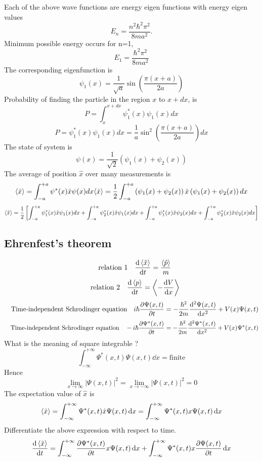 \documentclass[12pt]{article}
\begin{document}
Each of the above wave functions are energy eigen functions with energy eigen values $$E_{n}=\frac{n^2\hbar^2\pi^2}{8ma^2}.$$
Minimum possible energy occurs for n=1,   $$E_{1}=\frac{\hbar^2\pi^2}{8ma^2} $$
The corresponding eigenfunction is $$\psi_{1}(x)=\frac{1}{\sqrt{a}}\sin{\left(\frac{\pi(x+a)}{2a}\right)}$$
Probability of finding the particle in the region \( x\) to \(x+dx\), is \[P=\int_{x}^{x+dx}\psi_{1}^{*}(x)\psi_{1}(x)dx\]
\[P=\psi_{1}^{*}(x)\psi_{1}(x)dx=\frac{1}{a}\sin^{2}{\left(\frac{\pi(x+a)}{2a}\right)}dx\]
The state of system is \[\psi(x)=\frac{1}{\sqrt{2}}\left(\psi_{1}(x)+\psi_{2}(x) \right )\]
The average of position \(\hat{x}\) over many measurements is 
\[\expval{\hat{x}}=\int_{-a}^{+a}\psi^{*}(x)\hat{x}\psi(x)dx
\langle\hat{x}\rangle=\frac{1}{2}\int_{-a}^{+a}\left(\psi_{1}(x)+\psi_{2}(x) \right )\hat{x}\left(\psi_{1}(x)+\psi_{2}(x) \right )dx\]
\[\expval{\hat{x}}=\frac{1}{2}\left[\int_{-a}^{+a}\psi_{1}^{*}(x)\hat{x}\psi_{1}(x)dx+\int_{-a}^{+a}\psi_{2}^{*}(x)\hat{x}\psi_{1}(x) dx+\int_{-a}^{+a}\psi_{1}^{*}(x)\hat{x}\psi_{2}(x)dx+\int_{-a}^{+a}\psi_{2}^{*}(x) \hat{x}\psi_{2}(x) dx \right ]\]
\subsection{Ehrenfest's theorem}
\[\qq{relation 1}\dv{\expval{\hat{x}}}{t}=\frac{\expval{\hat{p}}}{m}\]
\[\qq{relation 2}\dv{\expval{p}}{t}=\expval{-\dv{V}{x}}\]
\[\qq{Time-independent Schrodinger equation}i\hbar\pdv{\Psi(x,t)}{t}=-\frac{\hbar^2}{2m}\dv[2]{\Psi(x,t)}{x}+V(x)\Psi(x,t)\]
\[\qq{Time-independent Schrodinger equation}-i\hbar\pdv{\Psi^*(x,t)}{t}=-\frac{\hbar^2}{2m}\dv[2]{\Psi^*(x,t)}{x}+V(x)\Psi^*(x,t)\]
What is the meaning of square integrable ?
\[\int_{-\infty}^{+\infty}\Psi^*(x,t)\Psi(x,t)\dd{x}=\text{finite}\]
Hence \[\lim_{x\to\infty}|\Psi(x,t)|^2=\lim_{x\to -\infty}|\Psi(x,t)|^2=0\]
The expectation value of $\hat{x}$ is \[\expval{\hat{x}}=\int_{-\infty}^{+\infty}\Psi^*(x,t)\hat{x}\Psi(x,t)\dd{x}=\int_{-\infty}^{+\infty}\Psi^*(x,t)x\Psi(x,t)\dd{x}\]
Differentiate the above expression with respect to time.
\[\dv{\expval{\hat{x}}}{t}=\int_{-\infty}^{+\infty}\pdv{\Psi^*(x,t)}{t}x\Psi(x,t)\dd{x}+\int_{-\infty}^{+\infty}\Psi^*(x,t)x\pdv{\Psi(x,t)}{t}\dd{x}\]
\end{document}

